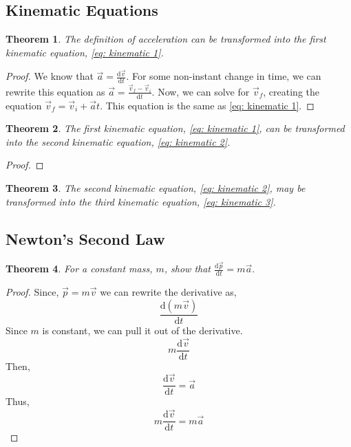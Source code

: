 \documentclass{article}
\newtheorem{theorem}{Theorem}[section]
\begin{document}
\subsection{Kinematic Equations}
\begin{theorem}
    The definition of acceleration can be transformed into the first kinematic equation, \ref{eq: kinematic 1}.
\end{theorem}
\begin{proof}
    We know that $\vec{a} = \frac{\mathrm{d}\vec{v}}{\mathrm{d}t}$. For some non-instant change in time, we can rewrite this equation as 
    $\vec{a} = \frac{\vec{v}_f - \vec{v}_i}{\mathrm{d}t}$. Now, we can solve for $\vec{v}_f$, creating the equation $\vec{v}_f = \vec{v}_i + \vec{a}t$.
    This equation is the same as \ref{eq: kinematic 1}.
\end{proof}

\begin{theorem}
    The first kinematic equation, \ref{eq: kinematic 1}, can be transformed into the second kinematic equation, \ref{eq: kinematic 2}.
\end{theorem}
\begin{proof}
      
\end{proof}

\begin{theorem}
    The second kinematic equation, \ref{eq: kinematic 2}, may be transformed into the third kinematic equation, \ref{eq: kinematic 3}.
\end{theorem}

\subsection{Newton's Second Law}
\begin{theorem}
For a constant mass, $m$, show that $\frac{\mathrm{d}\vec{p}}{\mathrm{d}t} = m\vec{a}.$
\end{theorem}
\begin{proof}
    Since, $\vec{p} = m \vec{v}$ we can rewrite the derivative as,
    \[ \frac{\mathrm{d}(m \vec{v})}{\mathrm{d}t} \]
    Since $m$ is constant, we can pull it out of the derivative.
    \[ m\frac{\mathrm{d}\vec{v}}{\mathrm{d}t} \]
    Then,
    \[\frac{\mathrm{d}\vec{v}}{\mathrm{d}t} = \vec{a}\]
    Thus, \[ m\frac{\mathrm{d}\vec{v}}{\mathrm{d}t} = m\vec{a}\]
\end{proof}
\end{document}
